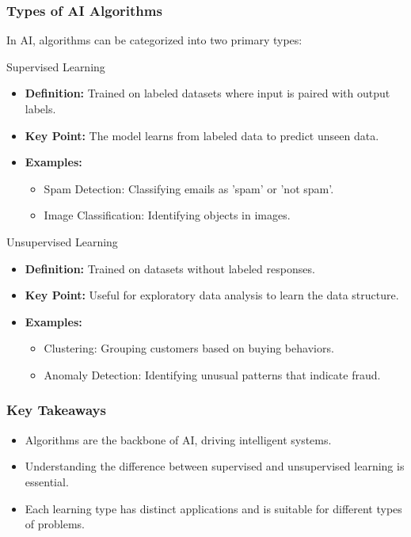 \documentclass{beamer}
\begin{document}
\begin{frame}[fragile]
    \frametitle{Types of AI Algorithms}
    In AI, algorithms can be categorized into two primary types: 
    \begin{block}{Supervised Learning}
        \begin{itemize}
            \item \textbf{Definition:} Trained on labeled datasets where input is paired with output labels.
            \item \textbf{Key Point:} The model learns from labeled data to predict unseen data.
            \item \textbf{Examples:}
                \begin{itemize}
                    \item Spam Detection: Classifying emails as 'spam' or 'not spam'.
                    \item Image Classification: Identifying objects in images.
                \end{itemize}
        \end{itemize}
    \end{block}
    
    \begin{block}{Unsupervised Learning}
        \begin{itemize}
            \item \textbf{Definition:} Trained on datasets without labeled responses.
            \item \textbf{Key Point:} Useful for exploratory data analysis to learn the data structure.
            \item \textbf{Examples:}
                \begin{itemize}
                    \item Clustering: Grouping customers based on buying behaviors.
                    \item Anomaly Detection: Identifying unusual patterns that indicate fraud.
                \end{itemize}
        \end{itemize}
    \end{block}
\end{frame}

\begin{frame}[fragile]
    \frametitle{Key Takeaways}
    \begin{itemize}
        \item Algorithms are the backbone of AI, driving intelligent systems.
        \item Understanding the difference between supervised and unsupervised learning is essential.
        \item Each learning type has distinct applications and is suitable for different types of problems.
    \end{itemize}
\end{frame}
\end{document}
